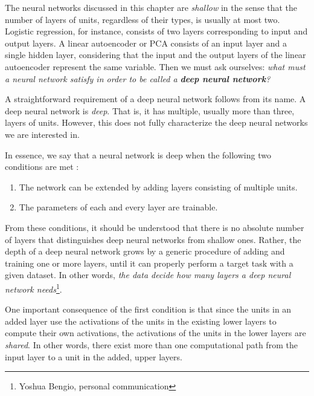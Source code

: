 \documentclass[dissertation,nocontribution,draft*]{aaltoseries}
\begin{document}
The neural networks discussed in this chapter are
\textit{shallow} in the sense that the number of layers of
units, regardless of their types, is usually at most two.
Logistic regression, for instance, consists of two layers
corresponding to input and output layers. A linear
autoencoder or PCA consists of an input layer and a single
hidden layer, considering that the input and the output
layers of the linear autoencoder represent the same
variable. Then we must ask ourselves: \textit{what must a
neural network satisfy in order to be called a \textbf{deep
neural network}?}

A straightforward requirement of a deep neural network
follows from its name. A deep neural network is
\textit{deep}. That is, it has
multiple, usually more than three, layers of units.
However, this does not fully characterize the deep neural
networks we are interested in.

In essence, we say that a neural network is deep 
when the following two conditions are met \citep[see, e.g.,][]{Bengio2007a}:
\begin{enumerate}
    \itemsep 0em
    \item The network can be extended by adding layers consisting of multiple units.
    \item The parameters of each and every layer are trainable.
\end{enumerate}

From these conditions, it should be understood that there is
no absolute number of layers that distinguishes deep neural
networks from shallow ones. Rather, the depth of a deep
neural network grows by a generic procedure of adding and
training one
or more layers, until it can properly perform a
target task with a given dataset. In other words,
\textit{the data decide how many layers a deep neural network
needs}\footnote{Yoshua Bengio, personal communication}. 

One important consequence of the first condition is that
since the units in an added layer use the activations of the
units in the existing lower layers to compute their own
activations, the activations of the units in the lower
layers are \textit{shared}.  In other words, there exist
more than one computational path from the input layer to a
unit in the added, upper layers.



\end{document}
